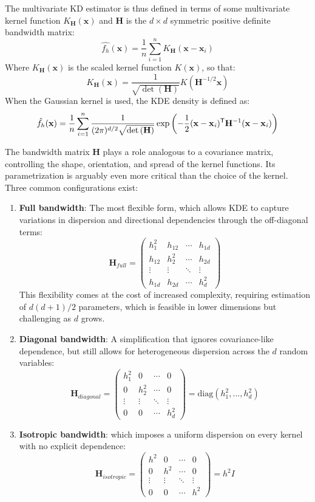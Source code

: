 The multivariate KD estimator is thus defined in terms of some multivariate kernel function $K_\mathbf{H}(\mathbf{x})$ and $\mathbf{H}$ is the $d\times d$ symmetric positive definite bandwidth matrix:
$$\displaystyle\hat{f_h}(\mathbf{x})=\frac{1}{n}\sum_{i=1}^{n}K_\mathbf{H}(\mathbf{x}-\mathbf{x}_i)$$
Where $K_\mathbf{H}(\mathbf{x})$ is the scaled kernel function $K(\mathbf{x})$, so that:
$$\displaystyle K_\mathbf{H}(\mathbf{x})=\frac{1}{\sqrt{\det{(\mathbf{H})}}}K(\mathbf{{H}^\mathrm{-1/2}x})$$
When the Gaussian kernel is used, the KDE density is defined as:
$$\displaystyle\hat{f_h}(\mathbf{x})=\frac{1}{n}\sum_{i=1}^{n}\frac{1}{(2\pi)^{d/2}\sqrt{\det{(\mathbf{H})}}}\exp\left(-\frac{1}{2}\mathbf{(x-x_{\it{i}})^\mathsf{T}H^\mathrm{-1}(x-x_{\it{i}})}\right)$$

The bandwidth matrix $\mathbf{H}$ plays a role analogous to a covariance matrix, controlling the shape, orientation, and spread of the kernel functions. Its parametrization is arguably even more critical than the choice of the kernel. Three common configurations exist:

\begin{enumerate}
\item \textbf{Full bandwidth}: The most flexible form, which allows KDE to capture variations in dispersion and directional dependencies through the off-diagonal terms:
$$\mathbf{H}_{full}=\begin{pmatrix}h^2_1 & h_{12} & \cdots & h_{1d} \\ h_{12} & h^2_2 & \cdots & h_{2d} \\ \vdots & \vdots & \ddots & \vdots \\ h_{1d} & h_{2d} & \cdots & h^2_d\end{pmatrix}$$
This flexibility comes at the cost of increased complexity, requiring estimation of $d(d+1)/2$ parameters, which is feasible in lower dimensions but challenging as $d$ grows.

\item \textbf{Diagonal bandwidth}: A simplification that ignores covariance-like dependence, but still allows for heterogeneous dispersion across the $d$ random variables: 
$$\mathbf{H}_{diagonal}=\begin{pmatrix}h^2_1 & 0 & \cdots & 0 \\ 0 & h^2_2 & \cdots & 0 \\ \vdots & \vdots & \ddots & \vdots \\ 0 & 0 & \cdots & h^2_d\end{pmatrix}=\text{diag}(h^{2}_{1}, ..., h^{2}_{d})$$

\item \textbf{Isotropic bandwidth}: which imposes a uniform dispersion on every kernel with no explicit dependence:
$$\mathbf{H}_{isotropic}=\begin{pmatrix}h^2 & 0 & \cdots & 0 \\ 0 & h^2 & \cdots & 0 \\ \vdots & \vdots & \ddots & \vdots \\ 0 & 0 & \cdots & h^2\end{pmatrix}=h^2I$$
\end{enumerate}

